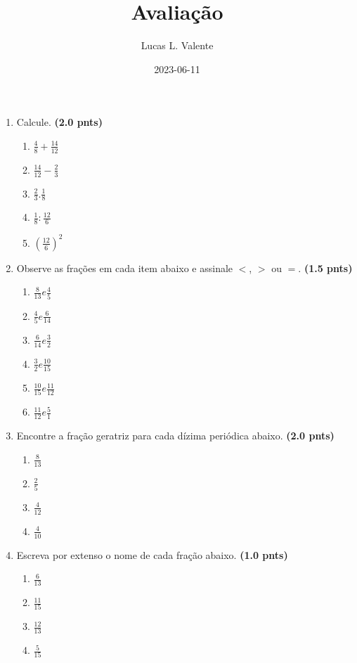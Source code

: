 \documentclass{article}
\title{Avaliação}
\author{Lucas L. Valente}
\date{2023-06-11}
\begin{document}
\maketitle
\newpage

\begin{enumerate}
	\item Calcule. \textbf{(2.0 pnts)}

		\begin{enumerate}
			\item $\frac{4}{8} + \frac{14}{12}$
			\item $\frac{14}{12} - \frac{2}{3}$
			\item $\frac{2}{3} . \frac{1}{8}$
			\item $\frac{1}{8} : \frac{12}{6}$
			\item $\left(\frac{12}{6}\right) ^ 2$
		\end{enumerate}

	\item Observe as frações em cada item abaixo e assinale $<$, $>$ ou $=$. \textbf{(1.5 pnts)}

		\begin{enumerate}
			\item $\frac{8}{13} e \frac{4}{5}$
			\item $\frac{4}{5} e \frac{6}{14}$
			\item $\frac{6}{14} e \frac{3}{2}$
			\item $\frac{3}{2} e \frac{10}{15}$
			\item $\frac{10}{15} e \frac{11}{12}$
			\item $\frac{11}{12} e \frac{5}{1}$
		\end{enumerate}

	\item Encontre a fração geratriz para cada dízima periódica abaixo. \textbf{(2.0 pnts)}

		\begin{enumerate}
			\item $\frac{8}{13}$
			\item $\frac{2}{5}$
			\item $\frac{4}{12}$
			\item $\frac{4}{10}$
		\end{enumerate}

	\item Escreva por extenso o nome de cada fração abaixo. \textbf{(1.0 pnts)}

		\begin{enumerate}
			\item $\frac{6}{13}$
			\item $\frac{11}{15}$
			\item $\frac{12}{13}$
			\item $\frac{5}{15}$
		\end{enumerate}


\end{enumerate}
\end{document}
